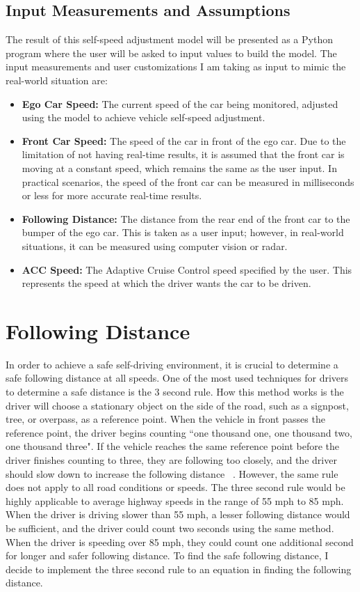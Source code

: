 \documentclass[12pt]{article}
\begin{document}
\subsection*{Input Measurements and Assumptions}
The result of this self-speed adjustment model will be presented as a Python program where the user will be asked to input values to build the model. The input measurements and user customizations I am taking as input to mimic the real-world situation are: 
\begin{itemize}
    \item \textbf{Ego Car Speed:} The current speed of the car being monitored, adjusted using the model to achieve vehicle self-speed adjustment.
    \item \textbf{Front Car Speed:} The speed of the car in front of the ego car. Due to the limitation of not having real-time results, it is assumed that the front car is moving at a constant speed, which remains the same as the user input. In practical scenarios, the speed of the front car can be measured in milliseconds or less for more accurate real-time results.
    \item \textbf{Following Distance:} The distance from the rear end of the front car to the bumper of the ego car. This is taken as a user input; however, in real-world situations, it can be measured using computer vision or radar.
    \item \textbf{ACC Speed:} The Adaptive Cruise Control speed specified by the user. This represents the speed at which the driver wants the car to be driven.
\end{itemize}


\section*{Following Distance}

In order to achieve a safe self-driving environment, it is crucial to determine a safe following distance at all speeds. One of the most used techniques for drivers to determine a safe distance is the 3 second rule. How this method works is the driver will choose a stationary object on the side of the road, such as a signpost, tree, or overpass, as a reference point. When the vehicle in front passes the reference point, the driver begins counting ``one thousand one, one thousand two, one thousand three". If the vehicle reaches the same reference point before the driver finishes counting to three, they are following too closely, and the driver should slow down to increase the following distance ~\cite{esc_three_second_rule}. However, the same rule does not apply to all road conditions or speeds. The three second rule would be highly applicable to average highway speeds in the range of 55 mph to 85 mph. When the driver is driving slower than 55 mph, a lesser following distance would be sufficient, and the driver could count two seconds using the same method. When the driver is speeding over 85 mph, they could count one additional second for longer and safer following distance. To find the safe following distance, I decide to implement the three second rule to an equation in finding the following distance. 
\end{document}
